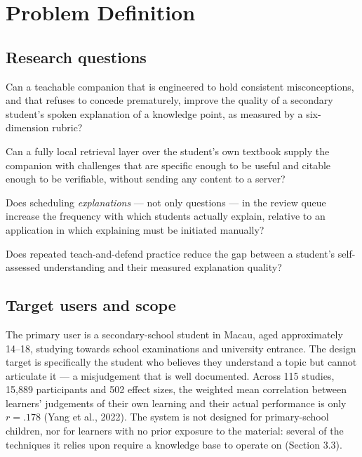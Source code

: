 \documentclass[11pt,a4paper]{article}
\begin{document}
\section{Problem Definition}

\subsection{Research questions}

\begin{description}[leftmargin=1.4em,style=nextline,itemsep=3pt]
  \item[RQ1 --- Explanation quality.] Can a teachable companion that is engineered to hold
  consistent misconceptions, and that refuses to concede prematurely, improve the quality of
  a secondary student's spoken explanation of a knowledge point, as measured by a
  six-dimension rubric?
  \item[RQ2 --- Grounded challenge.] Can a fully local retrieval layer over the student's own
  textbook supply the companion with challenges that are specific enough to be useful and
  citable enough to be verifiable, without sending any content to a server?
  \item[RQ3 --- Proactive delivery.] Does scheduling \emph{explanations} --- not only
  questions --- in the review queue increase the frequency with which students actually
  explain, relative to an application in which explaining must be initiated manually?
  \item[RQ4 --- Calibration.] Does repeated teach-and-defend practice reduce the gap between
  a student's self-assessed understanding and their measured explanation quality?
\end{description}

\subsection{Target users and scope}

The primary user is a secondary-school student in Macau, aged approximately 14--18, studying
towards school examinations and university entrance. The design target is specifically the
student who believes they understand a topic but cannot articulate it --- a misjudgement
that is well documented. Across 115 studies, 15{,}889 participants and 502 effect sizes, the
weighted mean correlation between learners' judgements of their own learning and their
actual performance is only \(r = .178\) (Yang et al., 2022). The system is not designed for
primary-school children, nor for learners with no prior exposure to the material: several of
the techniques it relies upon require a knowledge base to operate on (Section 3.3).
\end{document}
